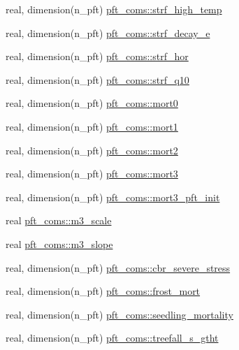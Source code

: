 \begin{DoxyCompactItemize}
\item 
real, dimension(n\+\_\+pft) \hyperlink{namespacepft__coms_a065e5f350ad9ac77d9a66c7486268fb8}{pft\+\_\+coms\+::strf\+\_\+high\+\_\+temp}
\item 
real, dimension(n\+\_\+pft) \hyperlink{namespacepft__coms_a5cfdb0129f160897b6cc37536a67cfc5}{pft\+\_\+coms\+::strf\+\_\+decay\+\_\+e}
\item 
real, dimension(n\+\_\+pft) \hyperlink{namespacepft__coms_a7ef86f21ed213453006c76ac60401a75}{pft\+\_\+coms\+::strf\+\_\+hor}
\item 
real, dimension(n\+\_\+pft) \hyperlink{namespacepft__coms_ab74ac70bc631850f0b352ce40c565acb}{pft\+\_\+coms\+::strf\+\_\+q10}
\item 
real, dimension(n\+\_\+pft) \hyperlink{namespacepft__coms_a70607e766522bb0ddd5329aa60d6b5e7}{pft\+\_\+coms\+::mort0}
\item 
real, dimension(n\+\_\+pft) \hyperlink{namespacepft__coms_a8a99e260a7d72b81ec6887289e4e8172}{pft\+\_\+coms\+::mort1}
\item 
real, dimension(n\+\_\+pft) \hyperlink{namespacepft__coms_a869ad0792b73ae5285eeab0a57534f34}{pft\+\_\+coms\+::mort2}
\item 
real, dimension(n\+\_\+pft) \hyperlink{namespacepft__coms_a20a7ffd42484a2150383fd540cd97641}{pft\+\_\+coms\+::mort3}
\item 
real, dimension(n\+\_\+pft) \hyperlink{namespacepft__coms_a1a1f98514e1c80f9ab10a76eacb4f7eb}{pft\+\_\+coms\+::mort3\+\_\+pft\+\_\+init}
\item 
real \hyperlink{namespacepft__coms_ad41cac7d6fa0b8d962cf3acd1d4b1587}{pft\+\_\+coms\+::m3\+\_\+scale}
\item 
real \hyperlink{namespacepft__coms_a27553d075979c77be9aceaf78a289109}{pft\+\_\+coms\+::m3\+\_\+slope}
\item 
real, dimension(n\+\_\+pft) \hyperlink{namespacepft__coms_aefc2c80125aa55f81fae3724cb4d5339}{pft\+\_\+coms\+::cbr\+\_\+severe\+\_\+stress}
\item 
real, dimension(n\+\_\+pft) \hyperlink{namespacepft__coms_a744036814ca3b450807de9613e918153}{pft\+\_\+coms\+::frost\+\_\+mort}
\item 
real, dimension(n\+\_\+pft) \hyperlink{namespacepft__coms_a0fe258b3674104f09d7226f87f39fc0b}{pft\+\_\+coms\+::seedling\+\_\+mortality}
\item 
real, dimension(n\+\_\+pft) \hyperlink{namespacepft__coms_a0dde76d7d9a1502fb5b2095ac6ea30fb}{pft\+\_\+coms\+::treefall\+\_\+s\+\_\+gtht}
\item 

\end{DoxyCompactItemize}
